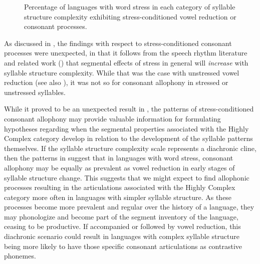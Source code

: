   
\begin{figure}
\caption{\label{fig:7.1}Percentage of languages with word stress in each category of syllable structure complexity exhibiting stress-conditioned vowel reduction or consonant processes.}
\end{figure}

As discussed in , the findings with respect to stress-conditioned consonant processes were unexpected, in that it follows from the speech rhythm literature and related work (\citealt{BybeeEtAl1998,Schiering2007}) that segmental effects of stress in general will \textit{increase} with syllable structure complexity. While that was the case with unstressed vowel reduction (see also ), it was not so for consonant allophony in stressed or unstressed syllables.

  While it proved to be an unexpected result in , the patterns of stress-conditioned consonant allophony may provide valuable information for formulating hypotheses regarding when the segmental properties associated with the Highly Complex category develop in relation to the development of the syllable patterns themselves. If the syllable structure complexity scale represents a diachronic cline, then the patterns in  suggest that in languages with word stress, consonant allophony may be equally as prevalent as vowel reduction in early stages of syllable structure change. This suggests that we might expect to find allophonic processes resulting in the articulations associated with the Highly Complex category more often in languages with simpler syllable structure. As these processes become more prevalent and regular over the history of a language, they may phonologize and become part of the segment inventory of the language, ceasing to be productive. If accompanied or followed by vowel reduction, this diachronic scenario could result in languages with complex syllable structure being more likely to have those specific consonant articulations as contrastive phonemes.\largerpage

